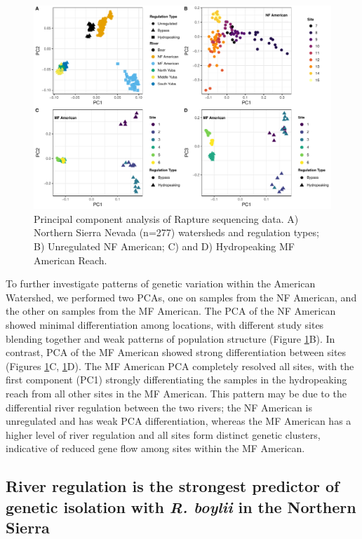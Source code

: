 \documentclass[proquest,12pt,final]{ucthesis-CA2012} %
\begin{document}
\begin{ucmainmatter}
\begin{figure}
\includegraphics[width=1\linewidth]{figure/ch1/fig_02_pca_combined_v2} \caption{Principal component analysis of Rapture sequencing
data. A) Northern Sierra Nevada (n=277) watersheds and regulation types;
B) Unregulated NF American; C) and D) Hydropeaking MF American Reach.}\label{fig:CH1F2pca}
\end{figure}
To further investigate patterns of genetic variation within the American
Watershed, we performed two PCAs, one on samples from the NF American,
and the other on samples from the MF American. The PCA of the NF
American showed minimal differentiation among locations, with different
study sites blending together and weak patterns of population structure
(Figure \ref{fig:CH1F2pca}B). In contrast, PCA of the MF American showed
strong differentiation between sites (Figures \ref{fig:CH1F2pca}C,
\ref{fig:CH1F2pca}D). The MF American PCA completely resolved all sites,
with the first component (PC1) strongly differentiating the samples in
the hydropeaking reach from all other sites in the MF American. This
pattern may be due to the differential river regulation between the two
rivers; the NF American is unregulated and has weak PCA differentiation,
whereas the MF American has a higher level of river regulation and all
sites form distinct genetic clusters, indicative of reduced gene flow
among sites within the MF American.

\hypertarget{river-regulation-is-the-strongest-predictor-of-genetic-isolation-with-r.-boylii-in-the-northern-sierra}{%
\subsection{\texorpdfstring{River regulation is the strongest predictor
of genetic isolation with \emph{R. boylii} in the Northern
Sierra}{River regulation is the strongest predictor of genetic isolation with R. boylii in the Northern Sierra}}\label{river-regulation-is-the-strongest-predictor-of-genetic-isolation-with-r.-boylii-in-the-northern-sierra}}


\end{ucmainmatter}
\end{document}
